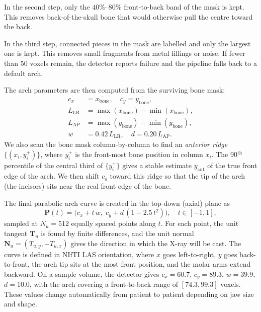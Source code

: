 \documentclass[conference]{IEEEtran}
\begin{document}
In the second step, only the $40\%$--$80\%$ front-to-back band of the mask is kept. This removes back-of-the-skull bone that would otherwise pull the centre toward the back.

In the third step, connected pieces in the mask are labelled and only the largest one is kept. This removes small fragments from metal fillings or noise. If fewer than 50 voxels remain, the detector reports failure and the pipeline falls back to a default arch.

The arch parameters are then computed from the surviving bone mask:
\begin{align}
    c_x &= \overline{x_{\text{bone}}},\quad c_y = \overline{y_{\text{bone}}}, \nonumber\\
    L_{\text{LR}} &= \max(x_{\text{bone}}) - \min(x_{\text{bone}}), \nonumber\\
    L_{\text{AP}} &= \max(y_{\text{bone}}) - \min(y_{\text{bone}}), \nonumber\\
    w &= 0.42\,L_{\text{LR}},\quad d = 0.20\,L_{\text{AP}}.
    \label{eq:arch}
\end{align}
We also scan the bone mask column-by-column to find an \emph{anterior ridge} $\{(x_i, y_i^{+})\}$, where $y_i^{+}$ is the front-most bone position in column $x_i$. The 90$^{\text{th}}$ percentile of the central third of $\{y_i^{+}\}$ gives a stable estimate $y_{\text{ant}}$ of the true front edge of the arch. We then shift $c_y$ toward this ridge so that the tip of the arch (the incisors) sits near the real front edge of the bone.

The final parabolic arch curve is created in the top-down (axial) plane as
\begin{equation}
    \mathbf{P}(t) = \big(c_x + t\,w,\; c_y + d\,(1 - 2.5\,t^2)\big), \quad t\in[-1, 1],
    \label{eq:arch_curve}
\end{equation}
sampled at $N_u = 512$ equally spaced points along $t$. For each point, the unit tangent $\mathbf{T}_u$ is found by finite differences, and the unit normal $\mathbf{N}_u = (T_{u,y}, -T_{u,x})$ gives the direction in which the X-ray will be cast. The curve is defined in NIfTI LAS orientation, where $x$ goes left-to-right, $y$ goes back-to-front, the arch tip sits at the most front position, and the molar arms extend backward. On a sample volume, the detector gives $c_x = 60.7$, $c_y = 89.3$, $w = 39.9$, $d = 10.0$, with the arch covering a front-to-back range of $[74.3, 99.3]$ voxels. These values change automatically from patient to patient depending on jaw size and shape.
\end{document}
